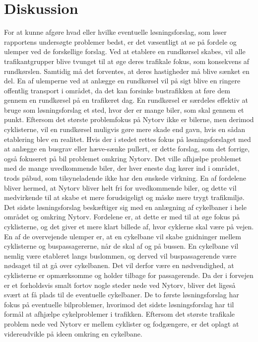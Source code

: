 \chapter{Diskussion}
\label{chap:diskussion}
For at kunne afgøre hvad eller hvilke eventuelle løsningsforslag, som løser rapportens undersøgte problemer bedst, er det væsentligt at se på fordele og ulemper ved de forskellige forslag. Ved at etablere en rundkørsel skabes, vil alle trafikantgrupper blive tvunget til at øge deres trafikale fokus, som konsekvens af rundkørslen. Samtidig må det forventes, at deres hastigheder må blive sænket en del. En af ulemperne ved at anlægge en rundkørsel vil på sigt blive en ringere offentlig transport i området, da det kan forsinke bustrafikken at føre dem gennem en rundkørsel på en trafikeret dag. En rundkørsel er særdeles effektiv at bruge som løsningsforslag et sted, hvor der er mange biler, som skal gennem et punkt. Eftersom det største problemfokus på Nytorv ikke er bilerne, men derimod cyklisterne, vil en rundkørsel muligvis gøre mere skade end gavn, hvis en sådan etablering blev en realitet.
Hvis der i stedet rettes fokus på løsningsforslaget med at anlægge en busgrav eller hæve-sænke pullert, er dette forslag, som det forrige, også fokuseret på bil problemet omkring Nytorv. Det ville afhjælpe problemet med de mange uvedkommende biler, der hver eneste dag kører ind i området, trods påbud, som tilsyneladende ikke har den ønskede virkning. En af fordelene bliver hermed, at Nytorv bliver helt fri for uvedkommende biler, og dette vil medvirkende til at skabe et mere forudsigeligt og måske mere trygt trafikmiljø.
Det sidste løsningsforslag beskæftiger sig med en anlægning af cykelbaner i hele området og omkring Nytorv. Fordelene er, at dette er med til at øge fokus på cyklisterne, og det giver et mere klart billede af, hvor cyklerne skal være på vejen. En af de overvejende ulemper er, at en cykelbane vil skabe gnidninger mellem cyklisterne og buspassagererne, når de skal af og på bussen. En cykelbane vil nemlig være etableret langs buslommen, og derved vil buspassagerende være nødsaget til at gå over cykelbanen. Det vil derfor være en nødvendighed, at cyklisterne er opmærksomme og holder tilbage for passagerende.
Da der i forvejen er et forholdsvis smalt fortov nogle steder nede ved Nytorv, bliver det ligeså svært at få plads til de eventuelle cykelbaner. De to første løsningsforslag har fokus på eventuelle bilproblemer, hvorimod det sidste løsningsforslag har til formål at afhjælpe cykelproblemer i trafikken. Eftersom det største trafikale problem nede ved Nytorv er mellem cyklister og fodgængere, er det oplagt at videreudvikle på ideen omkring en cykelbane.
